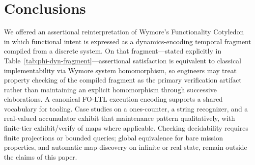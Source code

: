 \section{Conclusions}

We offered an assertional reinterpretation of Wymore's Functionality Cotyledon in which functional intent is expressed as a dynamics-encoding temporal fragment compiled from a discrete system. On that fragment---stated explicitly in Table~\ref{tab:phi-dyn-fragment}---assertional satisfaction is equivalent to classical implementability via Wymore system homomorphism, so engineers may treat property checking of the compiled fragment as the primary verification artifact rather than maintaining an explicit homomorphism through successive elaborations. A canonical FO-LTL execution encoding supports a shared vocabulary for tooling. Case studies on a ones-counter, a string recognizer, and a real-valued accumulator exhibit that maintenance pattern qualitatively, with finite-tier exhibit/verify of maps where applicable. Checking decidability requires finite projections or bounded queries; global equivalence for bare mission properties, and automatic map discovery on infinite or real state, remain outside the claims of this paper.
